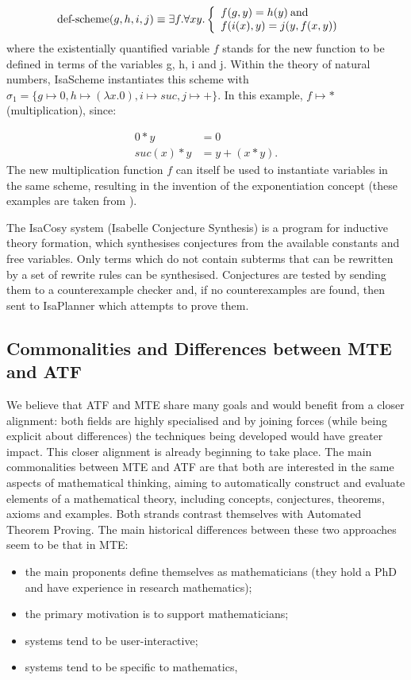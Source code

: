 \[
\text{def-scheme}(g,h,i,j) \equiv\\
  \exists f. \forall x y. \left\{
  \begin{array}{l l}
    f(g,y) = h (y)  \: \text{and}  & \\
    f(i(x),y) = j(y,f(x,y)) & \\
  \end{array} \right.
\]
where the existentially quantified variable $f$ stands for the new
function to be defined in terms of the variables g, h, i and j. Within
the theory of natural numbers, IsaScheme instantiates this scheme with
$\sigma_1 = \{g \mapsto 0, h \mapsto (\lambda x.0), i \mapsto suc, j
\mapsto +\}$. In this example, $f \mapsto *$ (multiplication), since:

\begin{align*}
0*y  &= 0 \\
suc(x) * y &=y + (x*y).
\end{align*}
The new multiplication function $f$ can itself be used to instantiate
variables in the same scheme, resulting in the invention of the
exponentiation concept (these examples are taken from
\cite{MontanoRivas2011}).

The IsaCosy system (Isabelle Conjecture Synthesis) is a program for
inductive theory formation, which synthesises conjectures from the
available constants and free variables. Only terms which do not
contain subterms that can be rewritten by a set of rewrite rules can
be synthesised.  Conjectures are tested by sending them to a
counterexample checker and, if no counterexamples are found, then sent
to IsaPlanner which attempts to prove them.


\subsection{Commonalities and Differences between MTE and ATF}

We believe that ATF and MTE share many goals and would benefit from a
closer alignment: both fields are highly specialised and by joining
forces (while being explicit about differences) the techniques being
developed would have greater impact. This closer alignment is already
beginning to take place. The main commonalities between MTE and ATF
are that both are interested in the same aspects of mathematical
thinking, aiming to automatically construct and evaluate elements of a
mathematical theory, including concepts, conjectures, theorems, axioms
and examples. Both strands contrast themselves with Automated Theorem
Proving. The main historical differences between these two approaches
seem to be that in MTE:
\begin{itemize}
\item the main proponents define themselves as mathematicians (they
  hold a PhD and have experience in research mathematics);
\item the primary motivation is to support mathematicians;
\item systems tend to be user-interactive;
\item systems tend to be specific to mathematics,
\end{itemize}

